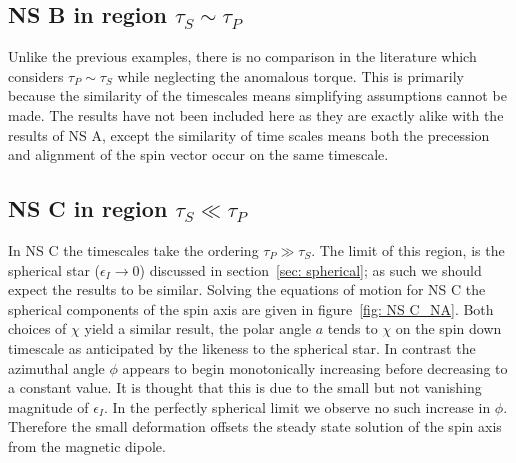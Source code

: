 \documentclass[/home/greg/Thesis/main/main.tex]{subfiles}
\begin{document}
\FloatBarrier
\subsection{NS B in region \texorpdfstring{$\tau_{S}\sim \tau_{P}$}{}}
\label{sec: B_NA}
Unlike the previous examples, there is no comparison in the literature which
considers $\tau_{P}\sim\tau_{S}$ while neglecting the anomalous torque. This is
primarily because the similarity of the timescales means simplifying
assumptions cannot be made. The results have not been included here as they are
exactly alike with the results of NS A, except the similarity of time
scales means both the precession and alignment of the spin vector occur on the
same timescale.

\FloatBarrier
\subsection{NS C in region \texorpdfstring{$\tau_{S}\ll \tau_{P}$}{}}
\label{sec: C_NA}
In NS C the timescales take the ordering $\tau_{P}\gg \tau_{S}$. The limit of 
this region, is the spherical star
($\epsilon_{I}\rightarrow0$) discussed in section~\ref{sec: spherical}; as such
we should expect the results to be similar. Solving
the equations of motion for NS C the spherical components of the spin axis
are given in figure~\ref{fig: NS C_NA}. Both choices of $\chi$ yield a
similar result, the polar angle $a$ tends to $\chi$ on the spin down timescale
as anticipated by the likeness to the spherical star. In contrast the azimuthal
angle $\phi$ appears to begin monotonically increasing before decreasing to a
constant value. It is thought that this is due to the small but not vanishing
magnitude of $\epsilon_{I}$. In the perfectly spherical limit we observe no
such increase in $\phi$. Therefore the small
deformation offsets the steady state solution of the spin axis from the
magnetic dipole. 
\end{document}
